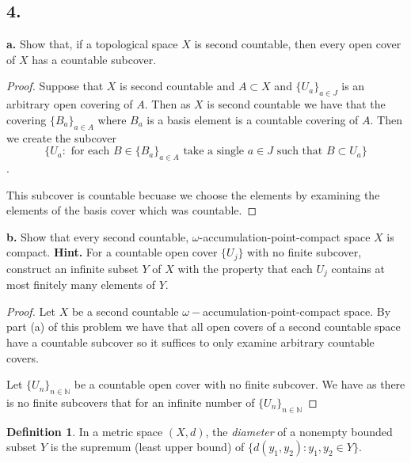 \documentclass{amsart}
\theoremstyle{plain}
\theoremstyle{definition}
\newtheorem{definition}[theorem]{Definition}
\theoremstyle{remark}
\begin{document}
\vspace{.15in}
\noindent
\subsection*{4.} 

\noindent
{\bfseries a.} Show that, if a topological space $X$ is second countable, then every open cover of $X$ has a countable subcover.

\begin{proof}
   Suppose that $X$ is second countable and $A\subset X$ and $\{U_a\}_{a\in J}$ is an arbitrary open covering of $A$. Then as $X$ is second countable we have that the covering $\{B_a\}_{a\in A}$ where $B_a$ is a basis element is a countable covering of $A$. Then we create the subcover \[\{U_a: \text{ for each }B\in  \{B_a\}_{a\in A}  \text{ take a single } a\in J \text{ such that } B\subset U_a\}\]. 

   This subcover is countable becuase we choose the elements by examining the elements of the basis cover which was countable. 




\end{proof}

\vspace{.1in}
\noindent
{\bfseries b.} Show that every second countable, $\omega$-accumulation-point-compact space $X$ is compact. {\bfseries Hint.} For a countable open cover $\{ U_j\}$ with no finite subcover, construct an infinite subset $Y$ of $X$ with the property that each $U_j$ contains at most finitely many elements of $Y$. 

\begin{proof}
    Let $X$ be a second countable $\omega-$accumulation-point-compact space. By part (a) of this problem we have that all open covers of a second countable space have a countable subcover so it suffices to only examine arbitrary countable covers.

    Let $\{U_n\}_{n\in \mathbb{N}}$ be a countable open cover with no finite subcover. We have as there is no finite subcovers that for an infinite number of $\{U_n\}_{n\in \mathbb{N}}$ 
    

\end{proof}

\vspace{.15in}
\begin{definition} In a metric space $(X,d)$, the {\it diameter} of a nonempty bounded subset $Y$ is the supremum (least upper bound) of $\{ d(y_1, y_2) : y_1, y_2 \in Y\}$. \end{definition}
\end{document}
